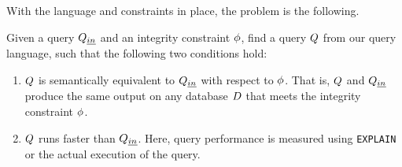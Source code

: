 With the language and constraints in place, the problem is the
following.

\begin{definition}
Given a query $Q_{\emph{in}}$ and an integrity constraint $\phi$, find a query $Q$ from our query language, such that the following two conditions hold: 
\begin{enumerate}[leftmargin=*]
\item 
$Q$ is semantically equivalent to $Q_{\emph{in}}$ with respect to $\phi$. 
That is, $Q$ and $Q_{\emph{in}}$ produce the same output on any database $D$ that meets the integrity constraint $\phi$. 
\item 
$Q$ runs faster than $Q_{\emph{in}}$. Here, query performance is measured using \texttt{EXPLAIN} or the actual execution of the query.
\end{enumerate}
\label{slab:def:problem}
\end{definition}

